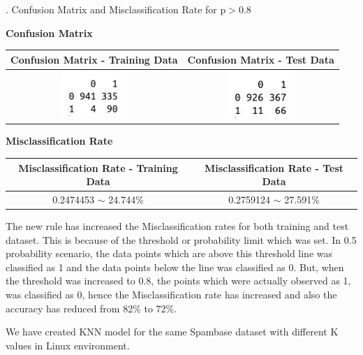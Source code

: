 \documentclass[a4paper,10pt]{article}
\begin{document}
. Confusion Matrix and Misclassification Rate for p$>$0.8 \par
\begin{center}
	\textbf{Confusion Matrix} \par
	\begin{tabular}{|c|c|}
		\hline
		Confusion Matrix - Training Data&
		Confusion Matrix - Test Data\\
		\hline
		\cellcolor{yellow!100} \includegraphics[width=25mm,scale=0.10]{Confusion_Matrix_training_Data_2.png} &
		\cellcolor{yellow!100} \includegraphics[width=25mm,scale=0.10]{Confusion_Matrix_test_Data_2.png}\\
		\hline
	\end{tabular}\par \par
	\textbf{Misclassification Rate} \par
	\begin{tabular}{|c|c|}
		\hline
		Misclassification Rate - Training Data&
		Misclassification Rate - Test Data\\
		\hline
		\cellcolor{yellow!100} 0.2474453 $\sim$ 24.744\% & \cellcolor{yellow!100} 0.2759124 $\sim$ 27.591\%\\
		\hline
	\end{tabular}\par
\end{center} 
The new rule has increased the Misclassification rates for both training and test dataset. This is because of the 
threshold or probability limit which was set. In 0.5 probability scenario, the data points which are above this 
threshold line was classified as 1 and the data points below the line was classified as 0. But, when the threshold
was increased to 0.8, the points which were actually observed as 1, was classified as 0, hence the Misclassification
rate has increased and also the accuracy has reduced from 82\% to 72\%.\par
\vspace{0.5cm}
We have created KNN model for the same Spambase dataset with different K values in Linux environment. 
\end{document}
